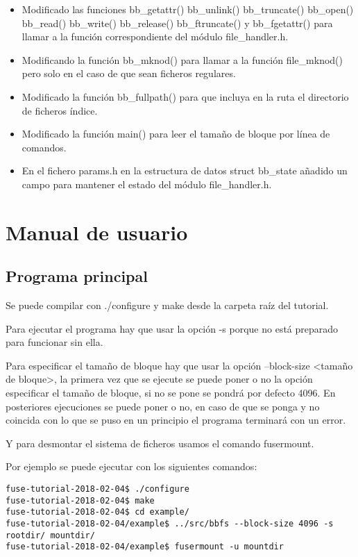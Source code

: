\documentclass[a4paper,12pt]{article}
\begin{document}
\begin{itemize}
\item Modificado las funciones bb\_getattr() bb\_unlink() bb\_truncate() bb\_open() bb\_read() bb\_write() bb\_release() bb\_ftruncate() y bb\_fgetattr() para llamar a la función correspondiente del módulo file\_handler.h.
\item Modificando la función bb\_mknod() para llamar a la función file\_mknod() pero solo en el caso de que sean ficheros regulares.
\item Modificado la función bb\_fullpath() para que incluya en la ruta el directorio de ficheros índice.
\item Modificado la función main() para leer el tamaño de bloque por línea de comandos.
\item En el fichero params.h en la estructura de datos struct bb\_state añadido un campo para mantener el estado del módulo file\_handler.h.
\end{itemize}




\section{Manual de usuario}

\subsection{Programa principal}
Se puede compilar con ./configure y make desde la carpeta raíz del tutorial.
\bigskip

Para ejecutar el programa hay que usar la opción -s porque no está preparado para funcionar sin ella.
\bigskip

Para especificar el tamaño de bloque hay que usar la opción --block-size <tamaño de bloque>, la primera vez que se ejecute se puede poner o no la opción especificar el tamaño de bloque, si no se pone se pondrá por defecto 4096. En posteriores ejecuciones se puede poner o no, en caso de que se ponga y no coincida con lo que se puso en un principio el programa terminará con un error.
\bigskip

Y para desmontar el sistema de ficheros usamos el comando fusermount.
\bigskip

Por ejemplo se puede ejecutar con los siguientes comandos:

\begin{verbatim}
fuse-tutorial-2018-02-04$ ./configure 
fuse-tutorial-2018-02-04$ make
fuse-tutorial-2018-02-04$ cd example/
fuse-tutorial-2018-02-04/example$ ../src/bbfs --block-size 4096 -s rootdir/ mountdir/
fuse-tutorial-2018-02-04/example$ fusermount -u mountdir
\end{verbatim}
\end{document}

